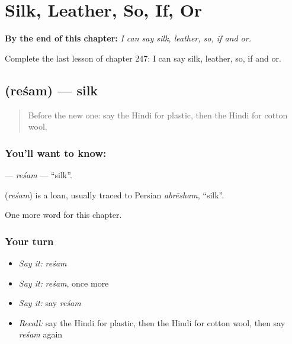 
\chapter{Silk, Leather, So, If, Or}
\label{ch:hi-silk-leather-so-if-or}

\begin{chapteropening}
\textbf{By the end of this chapter:} \emph{I can say silk, leather, so, if and or.}

Complete the last lesson of chapter 247: I can say silk, leather, so, if and or.
\end{chapteropening}

\section[\texorpdfstring{\hi{रेशम} (reśam)}{रेशम (reśam)}]{ (reśam) — silk}

\label{lesson:HI-C247-resam}



\begin{quote}
Before the new one: say the Hindi for plastic, then the Hindi for cotton wool.
\end{quote}

\subsection*{You'll want to know: }
\textbf{} — \emph{reśam} — \textquotedblleft{}silk\textquotedblright{}.

\begin{cousinweb}
\textbf{} (\emph{reśam}) is a loan, usually traced to Persian \emph{abrēsham}, \textquotedblleft{}silk\textquotedblright{}.
\end{cousinweb}

\begin{grammarlens}[title={What you've built}]
One more word for this chapter.
\end{grammarlens}

\subsection*{Your turn}
\begin{itemize}
\raggedright
  \item \emph{Say it:} \emph{reśam}
  \item \emph{Say it:} \emph{reśam}, once more
  \item \emph{Say it:} say \emph{reśam}
  \item \emph{Recall:} say the Hindi for plastic, then the Hindi for cotton wool, then say \emph{reśam} again
\end{itemize}


